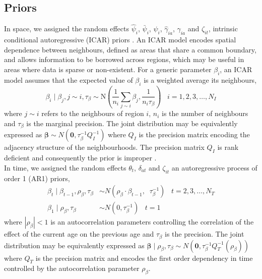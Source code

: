 \documentclass{article}
\begin{document}
\begin{appendix}

\subsection{Priors}


In space, we assigned the random effects $\hat{\psi}_i$, $\bar{\psi}_i$, $\psi_i$, $\hat{\gamma}_{ia}$, $\gamma_{ia}$ and $\zeta_{it}$, intrinsic conditional autoregressive (ICAR) priors \cite{besag1995conditional}. An ICAR model encodes spatial dependence between neighbours, defined as areas that share a common boundary, and allows information to be borrowed across regions, which may be useful in areas where data is sparse or non-existent. For a generic parameter $\beta_i$, an ICAR model assumes that the expected value of $\beta_i$ is a weighted average its neighbours, 
\begin{equation*}
	\beta_i \;|\; \beta_{j}, j \sim i, \tau_{\beta} \sim \text{N}\left(\frac{1}{n_i} \sum_{j \sim i} \beta_j, \frac{1}{n_i\tau_{\beta}} \right) \;\;\; i = 1, 2, 3,\ldots, N_I
\end{equation*}
where $j \sim i$ refers to the neighbours of region $i$, $n_i$ is the number of neighbours and $\tau_{\beta}$ is the marginal precision. The joint distribution may be equivalently expressed as $\boldsymbol{\beta} \sim N(\boldsymbol{0}, \tau_{\beta}^{-1}Q^{-1}_{I})$ where $Q_{I}$ is the precision matrix encoding the adjacency structure of the neighbourhoods. The precision matrix $Q_{I}$ is rank deficient and consequently the prior is improper \cite{rue2005gaussian}. \\

\noindent In time, we assigned the random effects $\theta_t$, $\delta_{at}$ and $\zeta_{it}$ an autoregressive process of order 1 (AR1) priors,
\begin{align*} 
  \beta_{t} \; | \; \beta_{t-1}, \rho_{\beta}, \tau_{\beta} &\sim N(\rho_{\beta} \cdot \beta_{t-1}, \;\; \tau^{-1}_{\beta}) \;\;\;  t = 2, 3,\ldots, N_T \\
  \beta_{1} \; | \; \rho_{\beta}, \tau_{\beta} &\sim N(0, \tau^{-1}_{\beta})  \;\;\;  t = 1
\end{align*}
where $|\rho_{\beta}| < 1$ is an autocorrelation parameters controlling the correlation of the effect of the current age on the previous age and $\tau_{\beta}$ is the precision. The joint distribution may be equivalently expressed as $\boldsymbol{\beta}\; | \; \rho_{\beta}, \tau_{\beta} \sim N(\boldsymbol{0}, \tau_{\beta}^{-1}Q^{-1}_{T}(\rho_{\beta}))$ where $Q_{T}$ is the precision matrix and encodes the first order dependency in time controlled by the autocorrelation parameter $\rho_{\beta}$.\\


\end{appendix}
\end{document}
